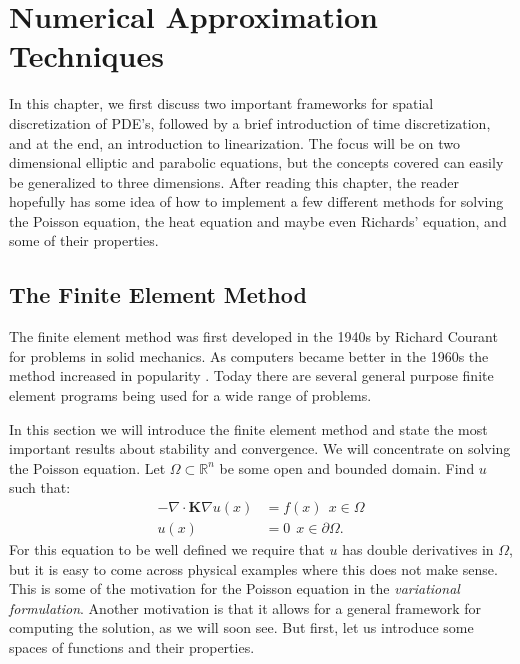 \documentclass[../Main/main.tex]{subfiles}
\begin{document}
	\graphicspath{{../Discretization/figs/}}
	\chapter{Numerical Approximation Techniques}
	\label{chap:numerical approximation}
	In this chapter, we first discuss two important frameworks for spatial discretization of PDE's, followed by a brief introduction of time discretization, and at the end, an introduction to linearization. The focus will be on two dimensional elliptic and parabolic equations, but the concepts covered can easily be generalized to three dimensions. After reading this chapter, the reader hopefully has some idea of how to implement a few different methods for solving the Poisson equation, the heat equation and maybe even Richards' equation, and some of their properties. 
	\section{The Finite Element Method}\label{sec:fem}

	The finite element method was first developed in the 1940s by Richard Courant for problems in solid mechanics. As computers became better in the 1960s the method increased in popularity \cite{Stein2014}. Today there are several general purpose finite element programs being used for a wide range of problems.\par
	In this section we will introduce the finite element method and state the most important results about stability and convergence.
	We will concentrate on solving the Poisson equation. Let $\Omega \subset \mathbb{R}^n$ be some open and bounded domain. Find $u$ such that:
	\begin{equation} \label{eq:poisson}
		\begin{split}
			-\nabla \cdot \bm{K} \nabla u(x) &= f(x) \ \  x\in \Omega \\ 
			u(x) &= 0 \ \ x\in \partial \Omega.
		\end{split}
	\end{equation}
	For this equation to be well defined we require that $u$ has double derivatives in $\Omega$, but it is easy to come across physical examples where this does not make sense.
	This is some of the motivation for the Poisson equation in the \emph{variational formulation}. Another motivation is that it allows for a general framework for computing the solution, as we will soon see. But first, let us introduce some spaces of functions and their properties.
	
\end{document}

